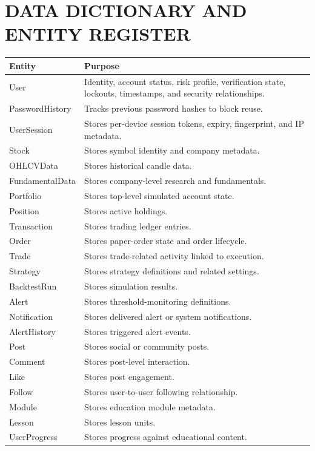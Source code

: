 \documentclass[12pt,a4paper]{report}
\begin{document}
\chapter{DATA DICTIONARY AND ENTITY REGISTER}
\begin{longtable}{p{} p{}}
\textbf{Entity} & \textbf{Purpose} \\
\hline
User & Identity, account status, risk profile, verification state, lockouts, timestamps, and security relationships. \\
PasswordHistory & Tracks previous password hashes to block reuse. \\
UserSession & Stores per-device session tokens, expiry, fingerprint, and IP metadata. \\
Stock & Stores symbol identity and company metadata. \\
OHLCVData & Stores historical candle data. \\
FundamentalData & Stores company-level research and fundamentals. \\
Portfolio & Stores top-level simulated account state. \\
Position & Stores active holdings. \\
Transaction & Stores trading ledger entries. \\
Order & Stores paper-order state and order lifecycle. \\
Trade & Stores trade-related activity linked to execution. \\
Strategy & Stores strategy definitions and related settings. \\
BacktestRun & Stores simulation results. \\
Alert & Stores threshold-monitoring definitions. \\
Notification & Stores delivered alert or system notifications. \\
AlertHistory & Stores triggered alert events. \\
Post & Stores social or community posts. \\
Comment & Stores post-level interaction. \\
Like & Stores post engagement. \\
Follow & Stores user-to-user following relationship. \\
Module & Stores education module metadata. \\
Lesson & Stores lesson units. \\
UserProgress & Stores progress against educational content. \\

\end{longtable}
\end{document}
